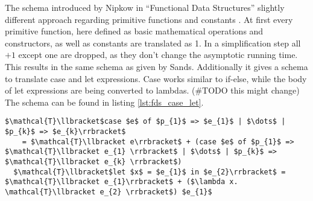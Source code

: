 The schema introduced by Nipkow in ``Functional Data Structures'' slightly different approach regarding primitive functions and constants \cite{fds}.
At first every primitive function, here defined as basic mathematical operations and constructors, as well as constants are translated as 1.
In a simplification step all $+ 1$ except one are dropped, as they don't change the asymptotic running time.
This results in the same schema as given by Sands.
Additionally it gives a schema to translate case and let expressions.
Case works similar to if-else, while the body of let expressions are being converted to lambdas. (\#TODO this might change)
The schema can be found in listing \ref{lst:fds_case_let}.
\begin{lstlisting}[language=isabelle,label=lst:fds_case_let,caption=Translation schema for case- and let-expression by Nipkow,mathescape=true]
  $\mathcal{T}\llbracket$case $e$ of $p_{1}$ => $e_{1}$ | $\dots$ | $p_{k}$ => $e_{k}\rrbracket$
    = $\mathcal{T}\llbracket e\rrbracket$ + (case $e$ of $p_{1}$ => $\mathcal{T}\llbracket e_{1} \rrbracket$ | $\dots$ | $p_{k}$ => $\mathcal{T}\llbracket e_{k} \rrbracket$)
  $\mathcal{T}\llbracket$let $x$ = $e_{1}$ in $e_{2}\rrbracket$ = $\mathcal{T}\llbracket e_{1}\rrbracket$ + ($\lambda x. \mathcal{T}\llbracket e_{2} \rrbracket$) $e_{1}$
\end{lstlisting}
